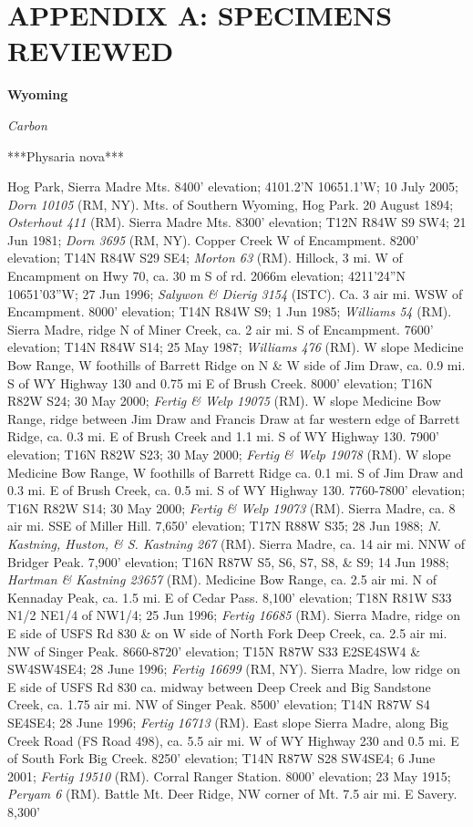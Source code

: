 \chapter*{APPENDIX A: SPECIMENS REVIEWED}

\textbf{Wyoming}

\textit{Carbon}

***Physaria nova***

Hog Park, Sierra Madre Mts. 8400’ elevation; 4101.2’N 10651.1’W; 10 July 2005; \textit{Dorn 10105} (RM, NY).  Mts. of Southern Wyoming, Hog Park. 20 August 1894; \textit{Osterhout 411} (RM).  Sierra Madre Mts. 8300’ elevation; T12N R84W S9 SW4; 21 Jun 1981; \textit{Dorn 3695} (RM, NY).  Copper Creek W of Encampment. 8200’ elevation; T14N R84W S29 SE4; \textit{Morton 63} (RM).  Hillock, 3 mi. W of Encampment on Hwy 70, ca. 30 m S of rd. 2066m elevation; 4211’24”N 10651’03”W; 27 Jun 1996; \textit{Salywon \& Dierig 3154} (ISTC).  Ca. 3 air mi. WSW of Encampment. 8000’ elevation; T14N R84W S9; 1 Jun 1985; \textit{Williams 54} (RM).  Sierra Madre, ridge N of Miner Creek, ca. 2 air mi. S of Encampment. 7600’ elevation; T14N R84W S14; 25 May 1987; \textit{Williams 476} (RM).  W slope Medicine Bow Range, W foothills of Barrett Ridge on N \& W side of Jim Draw, ca. 0.9 mi. S of WY Highway 130 and 0.75 mi E of Brush Creek. 8000’ elevation; T16N R82W S24; 30 May 2000; \textit{Fertig \& Welp 19075} (RM).  W slope Medicine Bow Range, ridge between Jim Draw and Francis Draw at far western edge of Barrett Ridge, ca. 0.3 mi. E of Brush Creek and 1.1 mi. S of WY Highway 130. 7900’ elevation; T16N R82W S23; 30 May 2000; \textit{Fertig \& Welp 19078} (RM).  W slope Medicine Bow Range, W foothills of Barrett Ridge ca. 0.1 mi. S of Jim Draw and 0.3 mi. E of Brush Creek, ca. 0.5 mi. S of WY Highway 130. 7760-7800’ elevation; T16N R82W S14; 30 May 2000; \textit{Fertig \& Welp 19073} (RM).  Sierra Madre, ca. 8 air mi. SSE of Miller Hill.  7,650’ elevation; T17N R88W S35; 28 Jun 1988; \textit{N. Kastning, Huston, \& S. Kastning 267} (RM).    Sierra Madre, ca. 14 air mi. NNW of Bridger Peak.  7,900’ elevation; T16N R87W S5, S6, S7, S8, \& S9; 14 Jun 1988; \textit{Hartman \& Kastning 23657} (RM).  Medicine Bow Range, ca. 2.5 air mi. N of Kennaday Peak, ca. 1.5 mi. E of Cedar Pass. 8,100’ elevation; T18N R81W S33 N1/2 NE1/4 of NW1/4; 25 Jun 1996; \textit{Fertig 16685} (RM).  Sierra Madre, ridge on E side of USFS Rd 830 \& on W side of North Fork Deep Creek, ca. 2.5 air mi. NW of Singer Peak. 8660-8720’ elevation; T15N R87W S33 E2SE4SW4 \& SW4SW4SE4; 28 June 1996; \textit{Fertig 16699} (RM, NY).  Sierra Madre, low ridge on E side of USFS Rd 830 ca. midway between Deep Creek and Big Sandstone Creek, ca. 1.75 air mi. NW of Singer Peak. 8500’ elevation; T14N R87W S4 SE4SE4; 28 June 1996; \textit{Fertig 16713} (RM).   East slope Sierra Madre, along Big Creek Road (FS Road 498), ca. 5.5 air mi. W of WY Highway 230 and 0.5 mi. E of South Fork Big Creek. 8250’ elevation; T14N R87W S28 SW4SE4; 6 June 2001; \textit{Fertig 19510} (RM).   Corral Ranger Station. 8000’ elevation; 23 May 1915; \textit{Peryam 6} (RM).  Battle Mt. Deer Ridge, NW corner of Mt.  7.5 air mi. E Savery.  8,300’ 